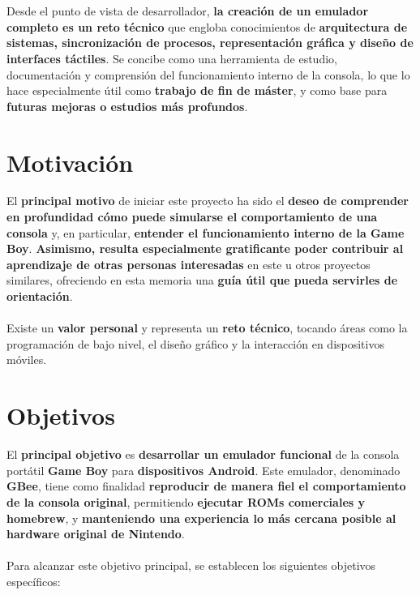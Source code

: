 \\\\
Desde el punto de vista de desarrollador, \textbf{la creación de un emulador completo es un reto técnico} que engloba conocimientos de \textbf{arquitectura de sistemas, sincronización de procesos, representación gráfica y diseño de interfaces táctiles}. Se concibe como una herramienta de estudio, documentación y comprensión del funcionamiento interno de la consola, lo que lo hace especialmente útil como \textbf{trabajo de fin de máster}, y como base para \textbf{futuras mejoras o estudios más profundos}.

\section{Motivación}
El \textbf{principal motivo} de iniciar este proyecto ha sido el \textbf{deseo de comprender en profundidad cómo puede simularse el comportamiento de una consola} y, en particular, \textbf{entender el funcionamiento interno de la Game Boy}. \textbf{Asimismo, resulta especialmente gratificante poder contribuir al aprendizaje de otras personas interesadas} en este u otros proyectos similares, ofreciendo en esta memoria una \textbf{guía útil que pueda servirles de orientación}.
\\\\
Existe un \textbf{valor personal} y representa un \textbf{reto técnico}, tocando áreas como la programación de bajo nivel, el diseño gráfico y la interacción en dispositivos móviles.

\section{Objetivos}
\label{objetivos}

El \textbf{principal objetivo} es \textbf{desarrollar un emulador funcional} de la consola portátil \textbf{Game Boy} para \textbf{dispositivos Android}. Este emulador, denominado \textbf{GBee}, tiene como finalidad \textbf{reproducir de manera fiel el comportamiento de la consola original}, permitiendo \textbf{ejecutar ROMs comerciales y homebrew}, y \textbf{manteniendo una experiencia lo más cercana posible al hardware original de Nintendo}.
\\\\
Para alcanzar este objetivo principal, se establecen los siguientes objetivos específicos:


